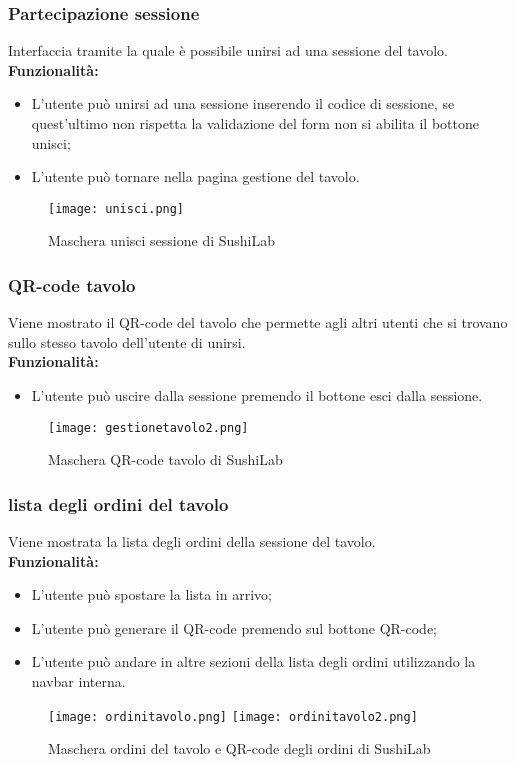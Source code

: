 \subsubsection{Partecipazione sessione}
Interfaccia tramite la quale è possibile unirsi ad una sessione del tavolo.\\
\textbf{Funzionalità:}
\begin{itemize}
    \item L'utente può unirsi ad una sessione inserendo il codice di sessione, se quest'ultimo non rispetta la validazione del form non si abilita il bottone unisci;
    \item L'utente può tornare nella pagina gestione del tavolo.
\end{itemize}
\begin{figure}[H]
    \centering
    \texttt{[image: unisci.png]}
    \caption{Maschera unisci sessione di SushiLab}
\end{figure}
\pagebreak

\subsubsection{QR-code tavolo}
Viene mostrato il QR-code del tavolo che permette agli altri utenti che si trovano sullo stesso tavolo dell'utente di unirsi.\\
\textbf{Funzionalità:}
\begin{itemize}
    \item L'utente può uscire dalla sessione premendo il bottone esci dalla sessione.
\end{itemize}
\begin{figure}[H]
    \centering
    \texttt{[image: gestionetavolo2.png]}
    \caption{Maschera QR-code tavolo di SushiLab}
\end{figure}
\pagebreak

\subsubsection{lista degli ordini del tavolo}
Viene mostrata la lista degli ordini della sessione del tavolo.\\
\textbf{Funzionalità:}
\begin{itemize}
    \item L'utente può spostare la lista in arrivo;
    \item L'utente può generare il QR-code premendo sul bottone QR-code;
    \item L'utente può andare in altre sezioni della lista degli ordini utilizzando la navbar interna.
\end{itemize}
\begin{figure}[H]
    \centering
    \texttt{[image: ordinitavolo.png]}
    \texttt{[image: ordinitavolo2.png]}
    \caption{Maschera ordini del tavolo e QR-code degli ordini di SushiLab}
\end{figure}
\pagebreak

